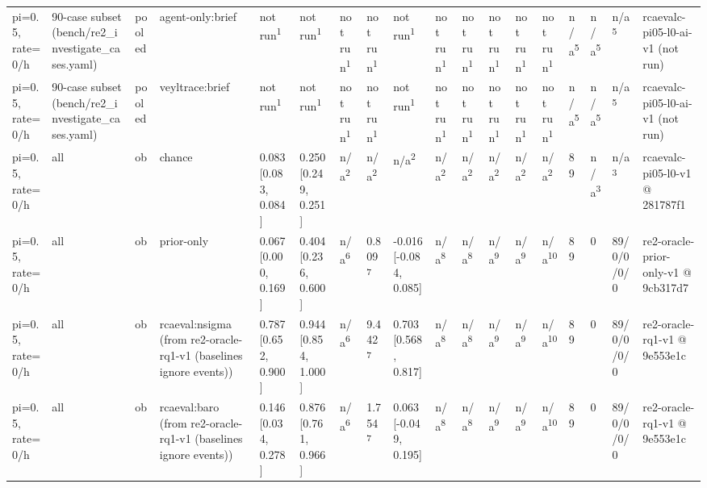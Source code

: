 \begin{table}[t]
\begin{tabular}{llllllllllllllllll}
pi=0.5, rate=0/h & 90-case subset (bench/re2\_investigate\_cases.yaml) & pooled & agent-only:brief & not run\textsuperscript{1} & not run\textsuperscript{1} & not run\textsuperscript{1} & not run\textsuperscript{1} & not run\textsuperscript{1} & not run\textsuperscript{1} & not run\textsuperscript{1} & not run\textsuperscript{1} & not run\textsuperscript{1} & not run\textsuperscript{1} & n/a\textsuperscript{5} & n/a\textsuperscript{5} & n/a\textsuperscript{5} & rcaevalc-pi05-l0-ai-v1 (not run) \\
pi=0.5, rate=0/h & 90-case subset (bench/re2\_investigate\_cases.yaml) & pooled & veyltrace:brief & not run\textsuperscript{1} & not run\textsuperscript{1} & not run\textsuperscript{1} & not run\textsuperscript{1} & not run\textsuperscript{1} & not run\textsuperscript{1} & not run\textsuperscript{1} & not run\textsuperscript{1} & not run\textsuperscript{1} & not run\textsuperscript{1} & n/a\textsuperscript{5} & n/a\textsuperscript{5} & n/a\textsuperscript{5} & rcaevalc-pi05-l0-ai-v1 (not run) \\
pi=0.5, rate=0/h & all & ob & chance & 0.083 [0.083, 0.084] & 0.250 [0.249, 0.251] & n/a\textsuperscript{2} & n/a\textsuperscript{2} & n/a\textsuperscript{2} & n/a\textsuperscript{2} & n/a\textsuperscript{2} & n/a\textsuperscript{2} & n/a\textsuperscript{2} & n/a\textsuperscript{2} & 89 & n/a\textsuperscript{3} & n/a\textsuperscript{3} & rcaevalc-pi05-l0-v1 @ 281787f1 \\
pi=0.5, rate=0/h & all & ob & prior-only & 0.067 [0.000, 0.169] & 0.404 [0.236, 0.600] & n/a\textsuperscript{6} & 0.809\textsuperscript{7} & -0.016 [-0.084, 0.085] & n/a\textsuperscript{8} & n/a\textsuperscript{8} & n/a\textsuperscript{9} & n/a\textsuperscript{9} & n/a\textsuperscript{10} & 89 & 0 & 89/0/0/0/0 & re2-oracle-prior-only-v1 @ 9cb317d7 \\
pi=0.5, rate=0/h & all & ob & rcaeval:nsigma (from re2-oracle-rq1-v1 (baselines ignore events)) & 0.787 [0.652, 0.900] & 0.944 [0.854, 1.000] & n/a\textsuperscript{6} & 9.442\textsuperscript{7} & 0.703 [0.568, 0.817] & n/a\textsuperscript{8} & n/a\textsuperscript{8} & n/a\textsuperscript{9} & n/a\textsuperscript{9} & n/a\textsuperscript{10} & 89 & 0 & 89/0/0/0/0 & re2-oracle-rq1-v1 @ 9e553e1c \\
pi=0.5, rate=0/h & all & ob & rcaeval:baro (from re2-oracle-rq1-v1 (baselines ignore events)) & 0.146 [0.034, 0.278] & 0.876 [0.761, 0.966] & n/a\textsuperscript{6} & 1.754\textsuperscript{7} & 0.063 [-0.049, 0.195] & n/a\textsuperscript{8} & n/a\textsuperscript{8} & n/a\textsuperscript{9} & n/a\textsuperscript{9} & n/a\textsuperscript{10} & 89 & 0 & 89/0/0/0/0 & re2-oracle-rq1-v1 @ 9e553e1c \\

\end{tabular}
\end{table}
